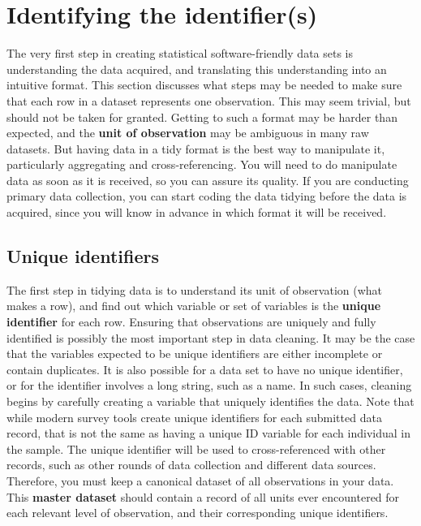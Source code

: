 \section{Identifying the identifier(s)}

The very first step in creating statistical software-friendly data sets
is understanding the data acquired,
and translating this understanding into an intuitive format.
This section discusses what steps may be needed to make sure that each row
in a dataset represents one observation.
This may seem trivial, but should not be taken for granted.
Getting to such a format may be harder than expected,
and the \textbf{unit of observation}
 may be ambiguous in many raw datasets.
But having data in a tidy format is the best way to manipulate it, 
particularly aggregating and cross-referencing.
You will need to do manipulate data as soon as it is received,
so you can assure its quality.
If you are conducting primary data collection,
you can start coding the data tidying before the data is acquired,
since you will know in advance in which format it will be received.

\subsection{Unique identifiers}

The first step in tidying data is to understand its unit of observation (what makes a row),
and find out which variable or set of variables is the \textbf{unique identifier} for each row.
Ensuring that observations are uniquely and fully identified
is possibly the most important step in data cleaning.
It may be the case that the variables expected to be unique identifiers are either incomplete or contain duplicates.
It is also possible for a data set to have no unique identifier, or for the identifier involves a long string, such as a name.
In such cases, cleaning begins by carefully creating a variable that uniquely identifies the data.
Note that while modern survey tools create unique identifiers for each submitted data record,
that is not the same as having a unique ID variable for each individual in the sample.
The unique identifier will be used to
cross-referenced with other records, such as
other rounds of data collection and
different data sources.
Therefore, you must keep a canonical dataset of all observations in your data.
This \textbf{master dataset}
should contain a record of all units ever encountered for each relevant level of observation,
and their corresponding unique identifiers.


